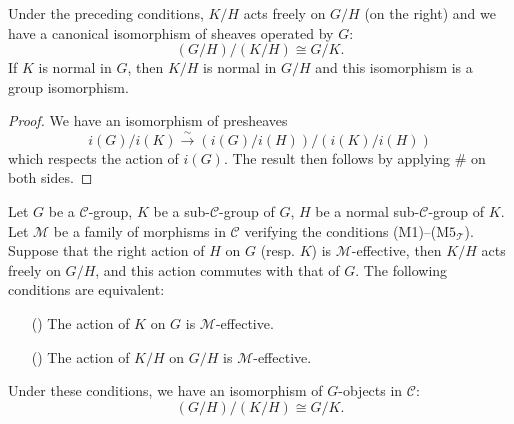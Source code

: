 \begin{proposition}\label{site sheaf quotient by normal subgroup third isomorphism}
Under the preceding conditions, $K/H$ acts freely on $G/H$ (on the right) and we have a canonical isomorphism of sheaves operated by $G$:
\[(G/H)/(K/H)\cong G/K.\]
If $K$ is normal in $G$, then $K/H$ is normal in $G/H$ and this isomorphism is a group isomorphism.
\end{proposition}
\begin{proof}
We have an isomorphism of presheaves
\[i(G)/i(K)\stackrel{\sim}{\to} (i(G)/i(H))/(i(K)/i(H))\]
which respects the action of $i(G)$. The result then follows by applying $\#$ on both sides.
\end{proof}

\begin{corollary}\label{site sheaf quotient by normal subgroup third isomorphism M-effective iff}
Let $G$ be a $\mathcal{C}$-group, $K$ be a sub-$\mathcal{C}$-group of $G$, $H$ be a normal sub-$\mathcal{C}$-group of $K$. Let $\mathcal{M}$ be a family of morphisms in $\mathcal{C}$ verifying the conditions (M1)--($\text{M5}_\mathcal{T}$). Suppose that the right action of $H$ on $G$ (resp. $K$) is $\mathcal{M}$-effective, then $K/H$ acts freely on $G/H$, and this action commutes with that of $G$. The following conditions are equivalent:
\begin{enumerate}
    \item[(\rmnum{1})] The action of $K$ on $G$ is $\mathcal{M}$-effective.
    \item[(\rmnum{2})] The action of $K/H$ on $G/H$ is $\mathcal{M}$-effective.
\end{enumerate}
Under these conditions, we have an isomorphism of $G$-objects in $\mathcal{C}$:
\[(G/H)/(K/H)\cong G/K.\]
\end{corollary}
